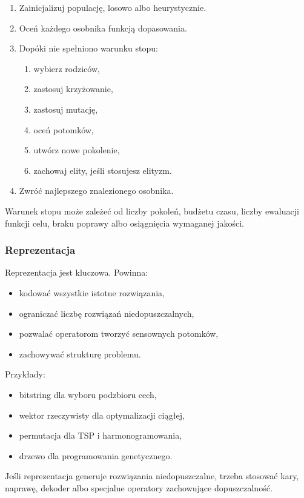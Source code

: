 \begin{enumerate}
  \item Zainicjalizuj populację, losowo albo heurystycznie.
  \item Oceń każdego osobnika funkcją dopasowania.
  \item Dopóki nie spełniono warunku stopu:
  \begin{enumerate}
    \item wybierz rodziców,
    \item zastosuj krzyżowanie,
    \item zastosuj mutację,
    \item oceń potomków,
    \item utwórz nowe pokolenie,
    \item zachowaj elity, jeśli stosujesz elityzm.
  \end{enumerate}
  \item Zwróć najlepszego znalezionego osobnika.
\end{enumerate}

Warunek stopu może zależeć od liczby pokoleń, budżetu czasu, liczby ewaluacji funkcji celu, braku poprawy albo osiągnięcia wymaganej jakości.

\subsubsection{Reprezentacja}

Reprezentacja jest kluczowa. Powinna:
\begin{itemize}
  \item kodować wszystkie istotne rozwiązania,
  \item ograniczać liczbę rozwiązań niedopuszczalnych,
  \item pozwalać operatorom tworzyć sensownych potomków,
  \item zachowywać strukturę problemu.
\end{itemize}

Przykłady:
\begin{itemize}
  \item bitstring dla wyboru podzbioru cech,
  \item wektor rzeczywisty dla optymalizacji ciągłej,
  \item permutacja dla TSP i harmonogramowania,
  \item drzewo dla programowania genetycznego.
\end{itemize}

Jeśli reprezentacja generuje rozwiązania niedopuszczalne, trzeba stosować kary, naprawę, dekoder albo specjalne operatory zachowujące dopuszczalność.

